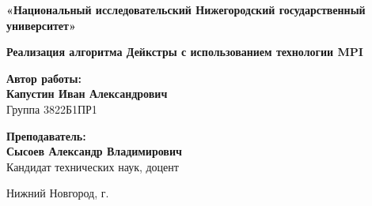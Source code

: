 \documentclass[a4paper,14pt]{extarticle}
\begin{document}
\begin{titlepage}
    \begin{center}
        \vspace*{-1cm} %
        {\large \textbf{«Национальный исследовательский Нижегородский государственный университет»}}
        
        \vspace{4cm} %
        {\LARGE \textbf{Реализация алгоритма Дейкстры с использованием технологии MPI}}
        
        \vspace{3cm} %
        \textbf{Автор работы:}\\
        \vspace{0.5cm}
        \textbf{Капустин Иван Александрович}\\
        Группа 3822Б1ПР1
        
        \vspace{1.5cm}
        \textbf{Преподаватель:}\\
        \vspace{0.5cm}
        \textbf{Сысоев Александр Владимирович}\\
        Кандидат технических наук, доцент
        
        \vfill %
        Нижний Новгород, \the\year{} г.
    \end{center}
\end{titlepage}
\end{document}
